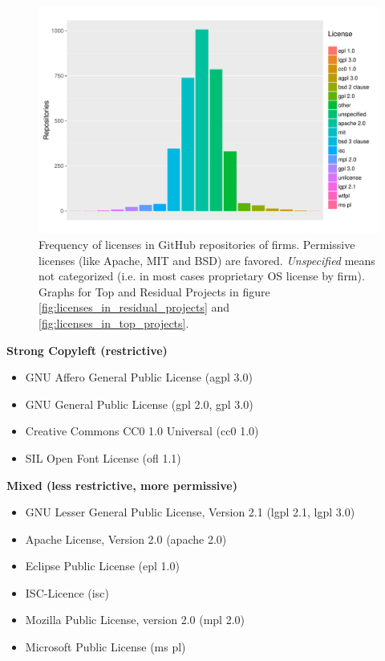 \begin{figure}[!h]
	\centering
	\includegraphics[page=1,scale=0.4]{../graphics/intro/licenses/popular_licenses.pdf}
	\caption{Frequency of licenses in GitHub repositories of firms. Permissive licenses (like Apache, MIT and BSD) are favored. \textit{Unspecified} means not categorized (i.e. in most cases proprietary OS license by firm). Graphs for Top and Residual Projects in figure \ref{fig:licenses_in_residual_projects} and \ref{fig:licenses_in_top_projects}.}
	\label{fig:licenses_in_projects}
\end{figure}

\clearpage
\textbf{Strong Copyleft (restrictive)}

\begin{itemize}
	\item GNU Affero General Public License (agpl 3.0)
	\item GNU General Public License (gpl 2.0, gpl 3.0)
	\item Creative Commons CC0 1.0 Universal (cc0 1.0)
	\item SIL Open Font License (ofl 1.1)
\end{itemize}

\textbf{Mixed (less restrictive, more permissive)}

\begin{itemize}
	\item GNU Lesser General Public License, Version 2.1 (lgpl 2.1, lgpl 3.0)
	\item Apache License, Version 2.0 (apache 2.0)
	\item Eclipse Public License (epl 1.0)
	\item ISC-Licence (isc)
	\item Mozilla Public License, version 2.0 (mpl 2.0)
	\item Microsoft Public License (ms pl)
\end{itemize}


